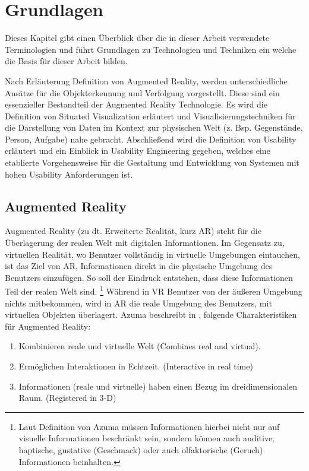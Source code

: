\chapter{Grundlagen} \label{CapterFundamentals}

Dieses Kapitel gibt einen Überblick über die in dieser Arbeit verwendete Terminologien und führt Grundlagen zu Technologien und Techniken ein welche die Basis für dieser Arbeit bilden. 

Nach Erläuterung Definition von Augmented Reality, werden unterschiedliche Ansätze für die Objekterkennung und Verfolgung vorgestellt.  
Diese sind ein essenzieller Bestandteil der Augmented Reality Technologie. Es wird die Definition von Situated Visualization erläutert 
und Visualisierungstechniken für die Darstellung von Daten im Kontext zur physischen Welt (z. Bsp. Gegenstände, Person, Aufgabe) nahe gebracht. 
Abschließend wird die Definition von Usability erläutert und ein Einblick in Usability Engineering gegeben, welches eine etablierte Vorgehensweise für die 
Gestaltung und Entwicklung von Systemen mit hohen Usability Anforderungen ist. 

\section{Augmented Reality}

Augmented Reality (zu dt. Erweiterte Realität, kurz AR) steht für die Überlagerung der realen Welt mit digitalen Informationen. \cite{Azuma.1997,DieterSchmalstieg2016} Im Gegensatz zu, virtuellen Realität, wo Benutzer vollständig in virtuelle Umgebungen eintauchen,
ist das Ziel von AR, Informationen direkt in die physische Umgebung des Benutzers einzufügen. So soll der Eindruck entstehen, dass diese Informationen Teil der realen Welt sind. \footnote{ Laut Definition von Azuma  müssen Informationen hierbei nicht nur auf visuelle Informationen beschränkt sein, 
sondern können auch auditive, haptische, gustative (Geschmack) oder auch olfaktorische (Geruch) Informationen beinhalten.} \cite{Azuma.1997} Während in VR Benutzer von der äußeren Umgebung nichts mitbekommen, wird in AR die reale Umgebung des Benutzers, mit virtuellen 
Objekten überlagert. Azuma beschreibt in \cite{Azuma.1997}, folgende Charakteristiken für Augmented Reality: 

\begin{enumerate}
	\item Kombinieren reale und virtuelle Welt (Combines real and virtual).
	\item Ermöglichen Interaktionen in Echtzeit. (Interactive in real time)
	\item Informationen (reale und virtuelle) haben einen Bezug im dreidimensionalen Raum. (Registered in 3-D)
\end{enumerate}

